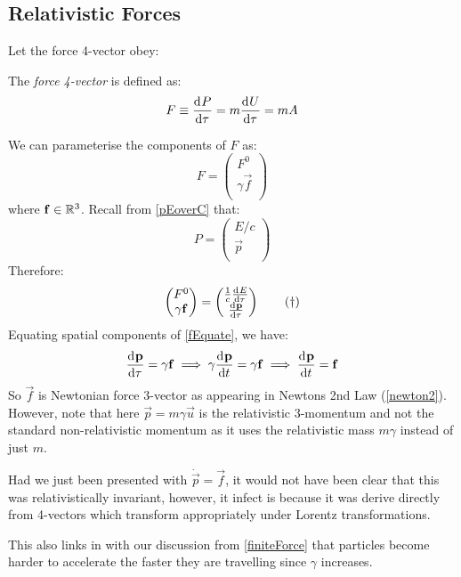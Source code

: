 \documentclass[../main.tex]{subfiles}
\begin{document}
\subsection{Relativistic Forces}
Let the force 4-vector obey:
\begin{definition}
  The \textit{force 4-vector} is defined as:
  \[
    F \equiv \deriv{P}{\tau} = m \deriv{U}{\tau} = mA
  \]
\end{definition}
We can parameterise the components of $F$ as:
\[
  F = \begin{pmatrix}
  F^{0} \\
  \gamma \vec{f} \\
  \end{pmatrix}
\]
where $\mathbf{\bm{f}} \in \mathbb{R}^3$.
Recall from \cref{pEoverC} that:
\[
  P = \begin{pmatrix}
  E/c \\
  \vec{p} \\
  \end{pmatrix}
\]
Therefore:
\begin{equation}
  \begin{pmatrix}
  F^{0} \\
  \gamma \vec{f} \\
  \end{pmatrix} = \begin{pmatrix}
  \frac{1}{c}\deriv{E}{\tau} \\
  \deriv{\vec{p}}{\tau} \\
  \end{pmatrix} \label{fEquate} \tag{$\dag$}
\end{equation}
Equating spatial components of \cref{fEquate}, we have:
\[
  \deriv{\vec{p}}{\tau} = \gamma \vec{f} \implies \gamma \deriv{\vec{p}}{t} = \gamma \vec{f} \implies \deriv{\vec{p}}{t} = \vec{f}
\]
So $\vec{f}$ is Newtonian force 3-vector as appearing in Newtons 2nd Law (\cref{newton2}).
However, note that here $\vec{p} = m\gamma\vec{u}$ is the relativistic 3-momentum and not the standard non-relativistic momentum as it uses the relativistic mass $m\gamma$ instead of just $m$.

Had we just been presented with $\dot{\vec{p}} = \vec{f}$, it would not have been clear that this was relativistically invariant, however, it infect is because it was derive directly from 4-vectors which transform appropriately under Lorentz transformations.

This also links in with our discussion from \cref{finiteForce} that particles become harder to accelerate the faster they are travelling since $\gamma$ increases.
\end{document}
